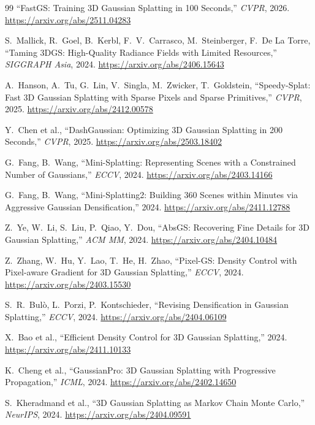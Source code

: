 \begin{thebibliography}{99}
 ``FastGS: Training 3D Gaussian Splatting in 100 Seconds,''
\textit{CVPR}, 2026. \url{https://arxiv.org/abs/2511.04283}

 S.~Mallick, R.~Goel, B.~Kerbl, F.~V.~Carrasco, M.~Steinberger,
F.~De La Torre, ``Taming 3DGS: High-Quality Radiance Fields with Limited Resources,''
\textit{SIGGRAPH Asia}, 2024. \url{https://arxiv.org/abs/2406.15643}

 A.~Hanson, A.~Tu, G.~Lin, V.~Singla, M.~Zwicker, T.~Goldstein,
``Speedy-Splat: Fast 3D Gaussian Splatting with Sparse Pixels and Sparse Primitives,''
\textit{CVPR}, 2025. \url{https://arxiv.org/abs/2412.00578}

 Y.~Chen et al., ``DashGaussian: Optimizing 3D Gaussian Splatting in
200 Seconds,'' \textit{CVPR}, 2025. \url{https://arxiv.org/abs/2503.18402}

 G.~Fang, B.~Wang, ``Mini-Splatting: Representing Scenes with
a Constrained Number of Gaussians,'' \textit{ECCV}, 2024.
\url{https://arxiv.org/abs/2403.14166}

 G.~Fang, B.~Wang, ``Mini-Splatting2: Building 360 Scenes
within Minutes via Aggressive Gaussian Densification,'' 2024.
\url{https://arxiv.org/abs/2411.12788}

 Z.~Ye, W.~Li, S.~Liu, P.~Qiao, Y.~Dou, ``AbsGS: Recovering Fine
Details for 3D Gaussian Splatting,'' \textit{ACM MM}, 2024.
\url{https://arxiv.org/abs/2404.10484}

 Z.~Zhang, W.~Hu, Y.~Lao, T.~He, H.~Zhao, ``Pixel-GS: Density
Control with Pixel-aware Gradient for 3D Gaussian Splatting,'' \textit{ECCV}, 2024.
\url{https://arxiv.org/abs/2403.15530}

 S.~R.~Bulò, L.~Porzi, P.~Kontschieder, ``Revising Densification
in Gaussian Splatting,'' \textit{ECCV}, 2024. \url{https://arxiv.org/abs/2404.06109}

 X.~Bao et al., ``Efficient Density Control for 3D Gaussian
Splatting,'' 2024. \url{https://arxiv.org/abs/2411.10133}

 K.~Cheng et al., ``GaussianPro: 3D Gaussian Splatting with
Progressive Propagation,'' \textit{ICML}, 2024. \url{https://arxiv.org/abs/2402.14650}

 S.~Kheradmand et al., ``3D Gaussian Splatting as Markov Chain Monte
Carlo,'' \textit{NeurIPS}, 2024. \url{https://arxiv.org/abs/2404.09591}


\end{thebibliography}
